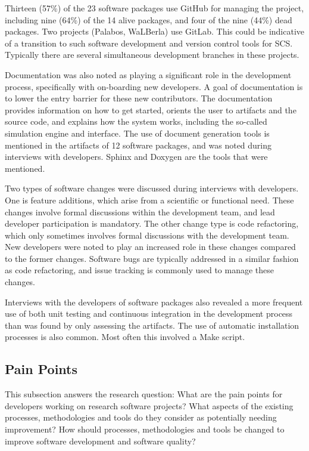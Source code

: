 \documentclass[12pt, notitlepage]{article}
\begin{document}
Thirteen (57\%) of the 23 software packages use GitHub for managing the project, including nine (64\%) of the 14 alive packages, and four of the nine (44\%) dead packages. Two projects (Palabos, WaLBerla) use GitLab. This could be indicative of a transition to such software development and version control tools for SCS. Typically there are several simultaneous development branches in these projects.

Documentation was also noted as playing a significant role in the development process, specifically with on-boarding new developers. A goal of documentation is to lower the entry barrier for these new contributors. The documentation provides information on how to get started, orients the user to artifacts and the source code, and explains how the system works, including the so-called simulation engine and interface. The use of document generation tools is mentioned in the artifacts of 12 software packages, and was noted during interviews with developers. Sphinx and Doxygen are the tools that were mentioned. 

Two types of software changes were discussed during interviews with developers. One is feature additions, which arise from a scientific or functional need. These changes involve formal discussions within the development team, and lead developer participation is mandatory. The other change type is code refactoring, which only sometimes involves formal discussions with the development team. New developers were noted to play an increased role in these changes compared to the former changes. Software bugs are typically addressed in a similar fashion as code refactoring, and issue tracking is commonly used to manage these changes. 

Interviews with the developers of software packages also revealed a more frequent use of both unit testing and continuous integration in the development process than was found by only assessing the artifacts. The use of automatic installation processes is also common. Most often this involved a Make script.


\subsection{Pain Points}\label{painpoints}

This subsection answers the research question: What are the pain points for developers working on research software projects? What aspects of the existing processes, methodologies and tools do they consider as potentially needing improvement? How should processes, methodologies and tools be changed to improve software development and software quality?
\end{document}
